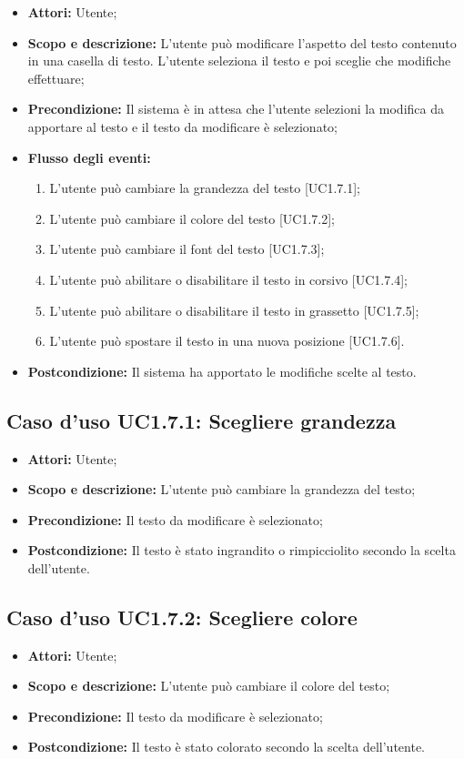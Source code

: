 \begin{itemize}
	\item \textbf{Attori:} Utente;
	\item \textbf{Scopo e descrizione:} L'utente può modificare l'aspetto del testo contenuto in una casella di testo. L'utente seleziona il testo e poi sceglie che modifiche effettuare;
	\item \textbf{Precondizione:} Il sistema è in attesa che l'utente selezioni la modifica da apportare al testo e il testo da modificare è selezionato;
	\item \textbf{Flusso degli eventi:}
	\begin{enumerate}
		\item L'utente può cambiare la grandezza del testo [UC1.7.1];
		\item L'utente può cambiare il colore del testo [UC1.7.2];
		\item L'utente può cambiare il \gls{font} del testo [UC1.7.3];
		\item L'utente può abilitare o disabilitare il testo in corsivo [UC1.7.4];
		\item L'utente può abilitare o disabilitare il testo in grassetto [UC1.7.5];
		\item L'utente può spostare il testo in una nuova posizione [UC1.7.6].
	\end{enumerate}
	\item \textbf{Postcondizione:} Il sistema ha apportato le modifiche scelte al testo.
\end{itemize}

\subsection{Caso d'uso UC1.7.1: Scegliere grandezza}
\begin{itemize}
	\item \textbf{Attori:} Utente;
	\item \textbf{Scopo e descrizione:} L'utente può cambiare la grandezza del testo;
	\item \textbf{Precondizione:} Il testo da modificare è selezionato;
	\item \textbf{Postcondizione:} Il testo è stato ingrandito o rimpicciolito secondo la scelta dell'utente.
\end{itemize}

\subsection{Caso d'uso UC1.7.2: Scegliere colore}
\begin{itemize}
	\item \textbf{Attori:} Utente;
	\item \textbf{Scopo e descrizione:} L'utente può cambiare il colore del testo;
	\item \textbf{Precondizione:} Il testo da modificare è selezionato;
	\item \textbf{Postcondizione:} Il testo è stato colorato secondo la scelta dell'utente.
\end{itemize}

